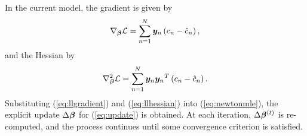 In the current model, the gradient is given by 
\begin{equation}
  \nabla_{\bb}\L = \sum_{n=1}^{N} \by_n\left(c_n - \hat{c}_n\right),%
  \label{eq:llgradient}
\end{equation}
and the Hessian by
\begin{equation}
  \nabla^2_{\bb}\L = \sum_{n=1}^{N} \by_n{\by_n}^T \left(c_n - \hat{c}_n\right).%
  \label{eq:llhessian}
\end{equation}
Substituting (\ref{eq:llgradient}) and (\ref{eq:llhessian}) into (\ref{eq:newtonmle}),
the explicit update $\Delta\bm{\beta}$ for (\ref{eq:update}) is obtained.
At each iteration, $\Delta\bm{\beta}^{(t)}$ is re-computed,
and the process continues until some convergence criterion is satisfied.
